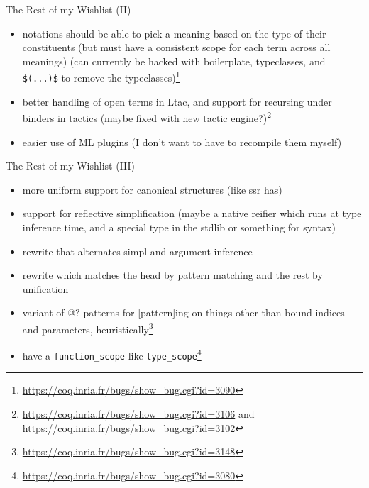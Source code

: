 \documentclass{beamer}
\begin{document}
\begin{frame}{The Rest of my Wishlist (II)}
\begin{itemize}
  \item
    notations should be able to pick a meaning based on the type of their constituents (but must have a consistent scope for each term across all meanings) (can currently be hacked with boilerplate, typeclasses, and \texttt{\$(...)\$} to remove the typeclasses)\footnote{\url{https://coq.inria.fr/bugs/show\_bug.cgi?id=3090}}
  \item 
    better handling of open terms in Ltac, and support for recursing under binders in tactics (maybe fixed with new tactic engine?)\footnote{\url{https://coq.inria.fr/bugs/show\_bug.cgi?id=3106} and \url{https://coq.inria.fr/bugs/show\_bug.cgi?id=3102}}
  \item 
    easier use of ML plugins (I don't want to have to recompile them myself)
\end{itemize}
\end{frame}

\begin{frame}{The Rest of my Wishlist (III)}
\begin{itemize}
  \item 
    more uniform support for canonical structures (like ssr has)
  \item 
    support for reflective simplification (maybe a native reifier which runs at type inference time, and a special type in the stdlib or something for syntax)
  \item 
    rewrite that alternates simpl and argument inference
  \item 
    rewrite which matches the head by pattern matching and the rest by unification
  \item 
    variant of @? patterns for [pattern]ing on things other than bound indices and parameters, heuristically\footnote{\url{https://coq.inria.fr/bugs/show\_bug.cgi?id=3148}}
  \item 
    have a \texttt{function\_scope} like \texttt{type\_scope}\footnote{\url{https://coq.inria.fr/bugs/show\_bug.cgi?id=3080}}
\end{itemize}
\end{frame}
\end{document}
